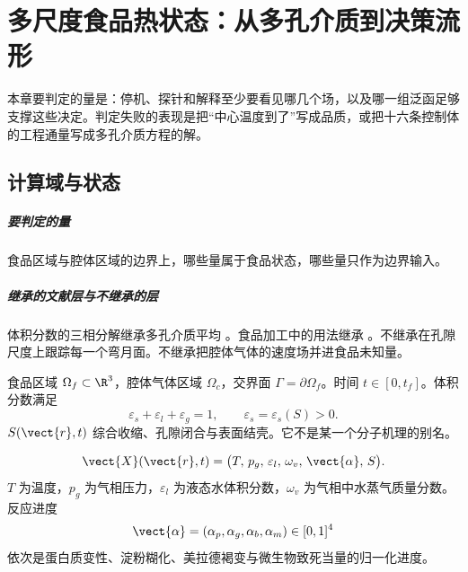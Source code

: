 \chapter{多尺度食品热状态：从多孔介质到决策流形}
\label{ch:physics}

本章要判定的量是：停机、探针和解释至少要看见哪几个场，以及哪一组泛函足够支撑这些决定。判定失败的表现是把“中心温度到了”写成品质，或把十六条控制体的工程通量写成多孔介质方程的解。

\section{计算域与状态}

\paragraph{要判定的量}
食品区域与腔体区域的边界上，哪些量属于食品状态，哪些量只作为边界输入。

\paragraph{继承的文献层与不继承的层}
体积分数的三相分解继承多孔介质平均 \cite{whitaker1977}。食品加工中的用法继承 \cite{datta2007}。不继承在孔隙尺度上跟踪每一个弯月面。不继承把腔体气体的速度场并进食品未知量。

食品区域 \(\Omega_f\subset\R^3\)，腔体气体区域 \(\Omega_c\)，交界面 \(\Gamma=\partial\Omega_f\)。时间 \(t\in[0,t_f]\)。体积分数满足
\begin{equation}
\varepsilon_s+\varepsilon_l+\varepsilon_g=1,\qquad \varepsilon_s=\varepsilon_s(S)>0.
\end{equation}
\(S(\vect{r},t)\) 综合收缩、孔隙闭合与表面结壳。它不是某一个分子机理的别名。

\begin{definition}[全场状态]
\label{def:fullstate}
\begin{equation}
\label{eq:state}
\vect{X}(\vect{r},t)=\big(T,\,p_g,\,\varepsilon_l,\,\omega_v,\,\vect{\alpha},\,S\big).
\end{equation}
\(T\) 为温度，\(p_g\) 为气相压力，\(\varepsilon_l\) 为液态水体积分数，\(\omega_v\) 为气相中水蒸气质量分数。反应进度
\begin{equation}
\vect{\alpha}=(\alpha_p,\alpha_g,\alpha_b,\alpha_m)\in[0,1]^4
\end{equation}
依次是蛋白质变性、淀粉糊化、美拉德褐变与微生物致死当量的归一化进度。
\end{definition}

